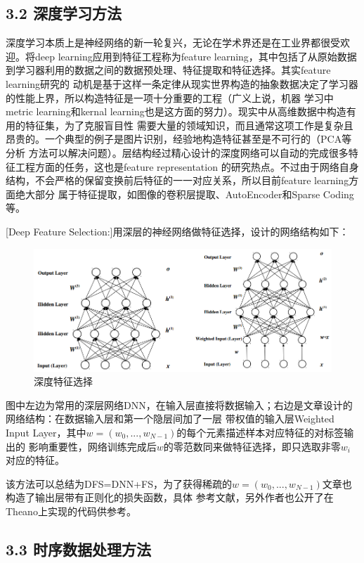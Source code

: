 \documentclass[a4paper,UTF8]{article}
\begin{document}
\subsection*{3.2 深度学习方法}
深度学习本质上是神经网络的新一轮复兴，无论在学术界还是在工业界都很受欢迎。将deep learning应用到特征工程称为feature
learning，其中包括了从原始数据到学习器利用的数据之间的数据预处理、特征提取和特征选择。其实feature learning研究的
动机是基于这样一条定律从现实世界构造的抽象数据决定了学习器的性能上界，所以构造特征是一项十分重要的工程（广义上说，机器
学习中metric learning和kernal learning也是这方面的努力）。现实中从高维数据中构造有用的特征集，为了克服盲目性
需要大量的领域知识，而且通常这项工作是复杂且昂贵的。一个典型的例子是图片识别，经验地构造特征甚至是不可行的（PCA等分析
方法可以解决问题）。层结构经过精心设计的深度网络可以自动的完成很多特征工程方面的任务，这也是feature representation
的研究热点。不过由于网络自身结构，不会严格的保留变换前后特征的一一对应关系，所以目前feature learning方面绝大部分
属于特征提取，如图像的卷积层提取、AutoEncoder和Sparse Coding等。

[Deep Feature Selection:]用深层的神经网络做特征选择，设计的网络结构如下：

\begin{figure}[!htbp]
  \centering
  \includegraphics[scale=0.4]{DFS.png}
  \caption{深度特征选择}
\end{figure}
图中左边为常用的深层网络DNN，在输入层直接将数据输入；右边是文章设计的网络结构：在数据输入层和第一个隐层间加了一层
带权值的输入层Weighted Input Layer，其中$w=(w_{0},...,w_{N-1})$的每个元素描述样本对应特征的对标签输出的
影响重要性，网络训练完成后$w$的零范数同来做特征选择，即只选取非零$w_{i}$对应的特征。

该方法可以总结为DFS=DNN+FS，为了获得稀疏的$w=(w_{0},...,w_{N-1})$文章也构造了输出层带有正则化的损失函数，具体
参考文献，另外作者也公开了在Theano上实现的代码供参考。\cite{wiki}


\subsection*{3.3 时序数据处理方法}
\end{document}
